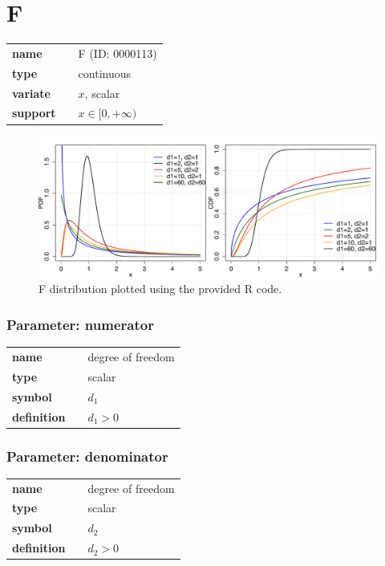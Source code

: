 \section*{F} 

  \bigskip 

\begin{tabular}{p{2cm}cl}
\textbf{name} & & F (ID: 0000113)\\ 
 
\textbf{type} & & continuous \\ 

\textbf{variate} & & $x$, scalar \\ 

\textbf{support} & & $x \in [0,+\infty)$
\end{tabular}

\begin{figure}[ht!]
\centering
  \includegraphics[width=140mm]{pics/F.pdf}
 \caption{F distribution plotted using the provided R code.}
 \label{fig:F}
\end{figure}

\subsubsection*{Parameter: numerator}

\noindent\begin{tabular}{p{2cm}cl}
\textbf{name} & & degree of freedom \\
\textbf{type} & & scalar \\
\textbf{symbol} & & $d_1$  \\
\textbf{definition} & & $d_1 > 0$
\end{tabular}
\subsubsection*{Parameter: denominator}

\noindent\begin{tabular}{p{2cm}cl}
\textbf{name} & & degree of freedom \\
\textbf{type} & & scalar \\
\textbf{symbol} & & $d_2$  \\
\textbf{definition} & & $d_2 > 0$
\end{tabular}
